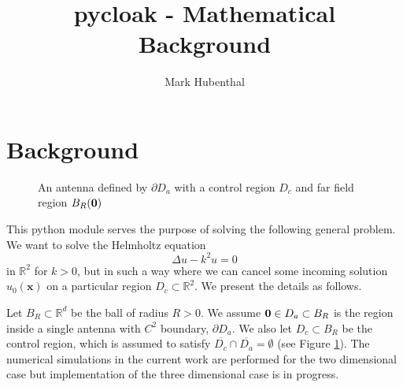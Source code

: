 \documentclass[11pt]{amsart}
\title{pycloak - Mathematical Background}
\date{}
\author[Mark Hubenthal]{Mark Hubenthal}
\theoremstyle{definition}
\theoremstyle{definition}
\theoremstyle{definition}
\def\B0{{\bf 0}}
\begin{document}
\maketitle

\section{Background}
\label{sec:background}
\begin{figure}
\centering
\def \svgwidth{0.4\linewidth}

\caption{An antenna defined by $\partial D_{a}$ with a control region $D_{c}$ and far field region $B_R(\B0)$ }\label{fig:mainsetup}
\end{figure}
This python module serves the purpose of solving the following general problem. We want to solve the Helmholtz equation
\begin{equation*}
\Delta u - k^{2} u = 0
\end{equation*}
in $\mathbb{R}^{2}$ for $k > 0$, but in such a way where we can cancel some incoming solution $u_{0}(\mathbf{x})$ on a particular region $D_{c} \subset \mathbb{R}^{2}$. We present the details as follows.

Let $B_{R} \subset \mathbb{R}^{d}$ be the ball of radius $R > 0$. We assume $\B0\in D_{a} \subset  B_{R}$ is the region inside a single antenna with $C^{2}$ boundary, $\partial D_{a}$. We also let $D_{c} \subset B_{R}$ be the control region, which is assumed to satisfy $\overline{D_{c}} \cap \overline{D_{a}} = \emptyset$ (see Figure \ref{fig:mainsetup}). The numerical simulations in the current work are performed for the two dimensional case but implementation of the three dimensional case is in progress.
\end{document}

